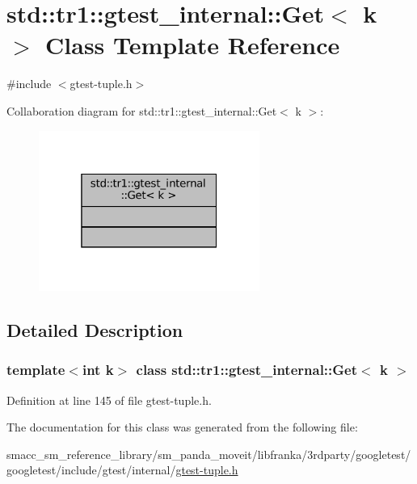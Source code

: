 \hypertarget{classstd_1_1tr1_1_1gtest__internal_1_1Get}{}\section{std\+:\+:tr1\+:\+:gtest\+\_\+internal\+:\+:Get$<$ k $>$ Class Template Reference}
\label{classstd_1_1tr1_1_1gtest__internal_1_1Get}


{\ttfamily \#include $<$gtest-\/tuple.\+h$>$}



Collaboration diagram for std\+:\+:tr1\+:\+:gtest\+\_\+internal\+:\+:Get$<$ k $>$\+:
\nopagebreak
\begin{figure}[H]
\begin{center}
\leavevmode
\includegraphics[width=205pt]{classstd_1_1tr1_1_1gtest__internal_1_1Get__coll__graph}
\end{center}
\end{figure}


\subsection{Detailed Description}
\subsubsection*{template$<$int k$>$\newline
class std\+::tr1\+::gtest\+\_\+internal\+::\+Get$<$ k $>$}



Definition at line 145 of file gtest-\/tuple.\+h.



The documentation for this class was generated from the following file\+:\begin{DoxyCompactItemize}
\item 
smacc\+\_\+sm\+\_\+reference\+\_\+library/sm\+\_\+panda\+\_\+moveit/libfranka/3rdparty/googletest/googletest/include/gtest/internal/\hyperlink{gtest-tuple_8h}{gtest-\/tuple.\+h}\end{DoxyCompactItemize}
